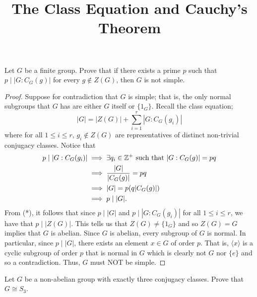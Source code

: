 \documentclass[a4paper]{article}
\title{The Class Equation and Cauchy's Theorem}
\begin{document}
\maketitle

\begin{problem}
    Let \( G  \) be a finite group. Prove that if there exists a prime \( p \) such that \( p \mid | G: {C}_{G}(g) |  \) for every \( g \notin Z(G) \), then \( G  \) is not simple.
\end{problem}
\begin{proof}
Suppose for contradiction that \( G \) is simple; that is, the only normal subgroups that \( G  \) has are either \( G  \) itself or \( \{ {1}_{G}  \}  \). Recall the class equation;
\[  | G |  = | Z(G) |  + \sum_{ i=1  }^{ r  } | G : {C}_{G}({g}_{i}) | \tag{*}  \] where for all \( 1 \leq i \leq r  \), \( {g}_{i} \notin Z(G) \) are representatives of distinct non-trivial conjugacy classes. Notice that 
\begin{align*}
    p \mid | G : {C}_{G}({g}_{i}) | &\implies \exists {q}_{i} \in \mathbb{Z}^{+} \ \text{such that} \ | G: {C}_{G}(g) |  = pq   \\
                                    &\implies \frac{ | G |  }{ | {C}_{G}(g) |  }  = pq \\
                                    &\implies | G | = p (q | {C}_{G}(g) | ) \\
                                    &\implies p \mid | G |.
\end{align*}
From (*), it follows that since \( p \mid | G |  \) and \( p \mid | G : {C}_{G}({g}_{i}) |  \) for all \( 1 \leq i \leq r  \), we have that \( p \mid | Z(G) |  \). This tells us that \( Z(G) \neq \{ {1}_{G} \}  \) and so \( Z(G) = G  \) implies that \( G  \) is abelian. Since \( G  \) is abelian, every subgroup of \( G  \) is normal. In particular, since \( p \mid | G |  \), there exists an element \( x \in G  \) of order \( p  \). That is, \( \langle x   \rangle  \) is a cyclic subgroup of order \( p  \) that is normal in \( G  \) which is clearly not \( G  \) nor \( \{ e \}  \) and so a contradiction. Thus, \( G  \) must NOT be simple.
\end{proof}

\begin{problem}
    Let \( G \) be a non-abelian group with exactly three conjugacy classes. Prove that \( G \cong {S}_{3} \).
\end{problem}
\end{document}
